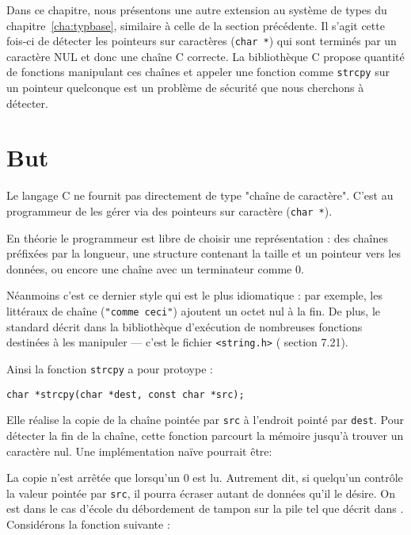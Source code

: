 Dans ce chapitre, nous présentons une autre extension au système de types du
chapitre~\ref{cha:typbase}, similaire à celle de la section précédente.
Il s'agit cette fois-ci de détecter les pointeurs sur caractères (\texttt{char
*}) qui sont terminés par un caractère NUL et donc une chaîne C correcte. La
bibliothèque C propose quantité de fonctions manipulant ces chaînes et appeler
une fonction comme \texttt{strcpy} sur un pointeur quelconque est un problème de
sécurité que nous cherchons à détecter.

\section{But}

Le langage C ne fournit pas directement de type "chaîne de caractère". C'est au
programmeur de les gérer via des pointeurs sur caractère (\texttt{char *}).

En théorie le programmeur est libre de choisir une représentation : des chaînes
préfixées par la longueur, une structure contenant la taille et un pointeur vers
les données, ou encore une chaîne avec un terminateur comme 0.

Néanmoins c'est ce dernier style qui est le plus idiomatique : par exemple, les
littéraux de chaîne (\texttt{"comme ceci"}) ajoutent un octet nul à la fin. De
plus, le standard décrit dans la bibliothèque d'exécution de nombreuses
fonctions destinées à les manipuler --- c'est le fichier
\texttt{\textless{}string.h\textgreater{}} (\cite{AnsiC} section 7.21).

Ainsi la fonction \texttt{strcpy} a pour protoype :

\begin{Verbatim}
char *strcpy(char *dest, const char *src);
\end{Verbatim}

Elle réalise la copie de la chaîne pointée par \texttt{src} à l'endroit pointé
par \texttt{dest}. Pour détecter la fin de la chaîne, cette fonction parcourt la
mémoire jusqu'à trouver un caractère nul. Une implémentation naïve pourrait être:


La copie n'est arrêtée que lorsqu'un 0 est lu. Autrement dit, si quelqu'un
contrôle la valeur pointée par \texttt{src}, il pourra écraser autant de données
qu'il le désire. On est dans le cas d'école du débordement de tampon sur la pile
tel que décrit dans \cite{SmashingTheStack}. Considérons la fonction suivante :

